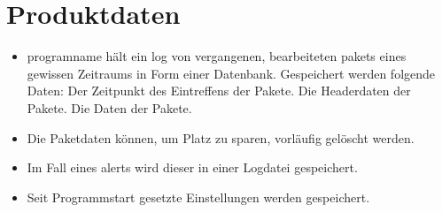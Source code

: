 \chapter{Produktdaten}


\begin{itemize}
  \item \gls{programname} hält ein \gls{log} von vergangenen, bearbeiteten \glspl{paket} eines gewissen Zeitraums in Form einer Datenbank. Gespeichert werden folgende Daten:
    \subitem Der Zeitpunkt des Eintreffens der Pakete.
    \subitem Die Headerdaten der Pakete.
    \subitem Die Daten der Pakete.
  \item Die Paketdaten können, um Platz zu sparen, vorläufig gelöscht werden.
  \item Im Fall eines \glspl{alert} wird dieser in einer Logdatei gespeichert.
  \item Seit Programmstart gesetzte Einstellungen werden gespeichert.
\end{itemize}
